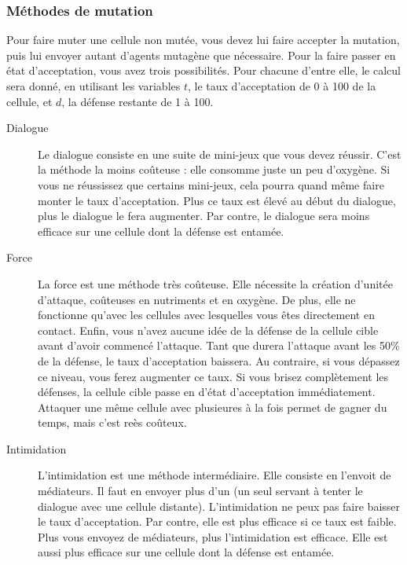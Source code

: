 \documentclass{article}
\begin{document}
\subsubsection{Méthodes de mutation}\label{muta}
Pour faire muter une cellule non mutée, vous devez lui faire accepter la mutation, puis lui envoyer autant d'agents mutagène que nécessaire. Pour la faire passer en état d'acceptation, vous avez trois possibilités. Pour chacune d'entre elle, le calcul sera donné, en utilisant les variables $t$, le taux d'acceptation de 0 à 100 de la cellule, et $d$, la défense restante de 1 à 100.
\begin{description}
	\item[Dialogue]\label{dialogue}
		Le dialogue consiste en une suite de mini-jeux que vous devez réussir. C'est la méthode la moins coûteuse : elle consomme juste un peu d'oxygène. Si vous ne réussissez que certains mini-jeux, cela pourra quand même faire monter le taux d'acceptation. Plus ce taux est élevé au début du dialogue, plus le dialogue le fera augmenter. Par contre, le dialogue sera moins efficace sur une cellule dont la défense est entamée.\\
	\item[Force]\label{force}
		La force est une méthode très coûteuse. Elle nécessite la création d'unitée d'attaque, coûteuses en nutriments et en oxygène. De plus, elle ne fonctionne qu'avec les cellules avec lesquelles vous êtes directement en contact. Enfin, vous n'avez aucune idée de la défense de la cellule cible avant d'avoir commencé l'attaque. Tant que durera l'attaque avant les 50\% de la défense, le taux d'acceptation baissera. Au contraire, si vous dépassez ce niveau, vous ferez augmenter ce taux. Si vous brisez complètement les défenses, la cellule cible passe en d'état d'acceptation immédiatement. Attaquer une même cellule avec plusieures à la fois permet de gagner du temps, mais c'est reès coûteux.
	\item[Intimidation]\label{intimi}
		L'intimidation est une méthode intermédiaire. Elle consiste en l'envoit de médiateurs. Il faut en envoyer plus d'un (un seul servant à tenter le dialogue avec une cellule distante). L'intimidation ne peux pas faire baisser le taux d'acceptation. Par contre, elle est plus efficace si ce taux est faible. Plus vous envoyez de médiateurs, plus l'intimidation est efficace. Elle est aussi plus efficace sur une cellule dont la défense est entamée.
\end{description}
\end{document}
